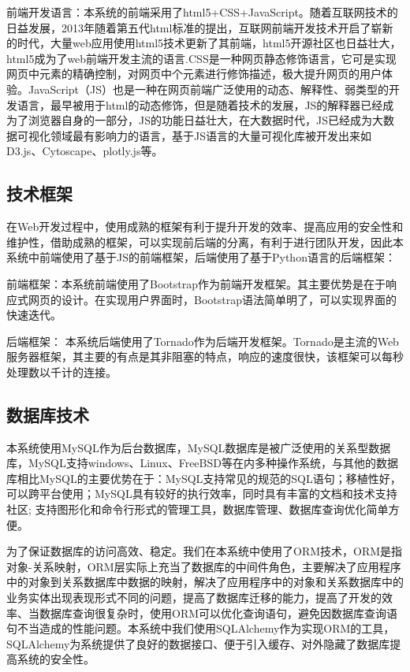 前端开发语言：本系统的前端采用了html5+CSS+JavaScript。随着互联网技术的日益发展，2013年随着第五代html标准的提出，互联网前端开发技术开启了崭新的时代，大量web应用使用html5技术更新了其前端，html5开源社区也日益壮大，html5成为了web前端开发主流的语言.CSS是一种网页静态修饰语言，它可是实现网页中元素的精确控制，对网页中个元素进行修饰描述，极大提升网页的用户体验。JavaScript（JS）也是一种在网页前端广泛使用的动态、解释性、弱类型的开发语言，最早被用于html的动态修饰，但是随着技术的发展，JS的解释器已经成为了浏览器自身的一部分，JS的功能日益壮大，在大数据时代，JS已经成为大数据可视化领域最有影响力的语言，基于JS语言的大量可视化库被开发出来如D3.js、Cytoscape、plotly.js等。

\subsection{技术框架}
在Web开发过程中，使用成熟的框架有利于提升开发的效率、提高应用的安全性和维护性，借助成熟的框架，可以实现前后端的分离，有利于进行团队开发，因此本系统中前端使用了基于JS的前端框架，后端使用了基于Python语言的后端框架：

前端框架：本系统前端使用了Bootstrap作为前端开发框架。其主要优势是在于响应式网页的设计。在实现用户界面时，Bootstrap语法简单明了，可以实现界面的快速迭代。

后端框架： 本系统后端使用了Tornado作为后端开发框架。Tornado是主流的Web服务器框架，其主要的有点是其非阻塞的特点，响应的速度很快，该框架可以每秒处理数以千计的连接。


\subsection{数据库技术}
本系统使用MySQL作为后台数据库，MySQL数据库是被广泛使用的关系型数据库，MySQL支持windows、Linux、FreeBSD等在内多种操作系统，与其他的数据库相比MySQL的主要优势在于：MySQL支持常见的规范的SQL语句；移植性好，可以跨平台使用；MySQL具有较好的执行效率，同时具有丰富的文档和技术支持社区; 支持图形化和命令行形式的管理工具，数据库管理、数据库查询优化简单方便。

为了保证数据库的访问高效、稳定。我们在本系统中使用了ORM技术，ORM是指对象-关系映射，ORM层实际上充当了数据库的中间件角色，主要解决了应用程序中的对象到关系数据库中数据的映射，解决了应用程序中的对象和关系数据库中的业务实体出现表现形式不同的问题，提高了数据库迁移的能力，提高了开发的效率、当数据库查询很复杂时，使用ORM可以优化查询语句，避免因数据库查询语句不当造成的性能问题。本系统中我们使用SQLAlchemy作为实现ORM的工具，SQLAlchemy为系统提供了良好的数据接口、便于引入缓存、对外隐藏了数据库提高系统的安全性。

